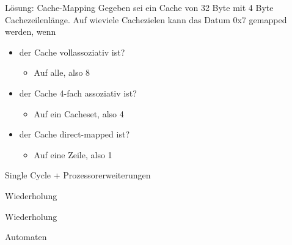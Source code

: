 \documentclass[
  german,            %
  aspectratio=169,    %
]{tumbeamer}
\begin{document}
\begin{frame}[c]{Lösung: Cache-Mapping}{}
	Gegeben sei ein Cache von 32 Byte mit 4 Byte Cachezeilenlänge. Auf wieviele Cachezielen kann das Datum 0x7 gemapped werden, wenn
	\vspace{0.5cm}
	\begin{itemize}
		\item der Cache vollassoziativ ist?
		\begin{itemize}
			\item Auf alle, also 8
		\end{itemize}
		\item der Cache 4-fach assoziativ ist?
		\begin{itemize}
			\item Auf ein Cacheset, also 4
		\end{itemize}
		\item der Cache direct-mapped ist?
		\begin{itemize}
			\item Auf eine Zeile, also 1
		\end{itemize}
	\end{itemize}
\end{frame}

\begin{frame}[c]{Single Cycle + Prozessorerweiterungen}{}
	\begin{center}
	  \LARGE Wiederholung
	\end{center}
\end{frame}


\begin{frame}[c]{Wiederholung}{}
	\begin{center}
	  \LARGE Automaten
	\end{center}
\end{frame}
\end{document}
